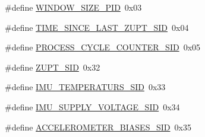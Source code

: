 \begin{DoxyCompactItemize}
\item 
\#define \hyperlink{group__tables_ga1e61a3b04f0d9e2a1393e85a047a24ab}{\-W\-I\-N\-D\-O\-W\-\_\-\-S\-I\-Z\-E\-\_\-\-P\-I\-D}~0x03
\item 
\#define \hyperlink{group__tables_gadc587c273985fd12fc0553141c5f9693}{\-T\-I\-M\-E\-\_\-\-S\-I\-N\-C\-E\-\_\-\-L\-A\-S\-T\-\_\-\-Z\-U\-P\-T\-\_\-\-S\-I\-D}~0x04
\item 
\#define \hyperlink{group__tables_gacc410e7c7f1185c5dd50ac503dccabbe}{\-P\-R\-O\-C\-E\-S\-S\-\_\-\-C\-Y\-C\-L\-E\-\_\-\-C\-O\-U\-N\-T\-E\-R\-\_\-\-S\-I\-D}~0x05
\item 
\#define \hyperlink{group__tables_ga1c2e91b10f17814f52bf09f647909d83}{\-Z\-U\-P\-T\-\_\-\-S\-I\-D}~0x32
\item 
\#define \hyperlink{group__tables_gad5186a188194306bbc87ddddc7644ddd}{\-I\-M\-U\-\_\-\-T\-E\-M\-P\-E\-R\-A\-T\-U\-R\-S\-\_\-\-S\-I\-D}~0x33
\item 
\#define \hyperlink{group__tables_gad0a37f572243f76ea1f2b79fc14b2a30}{\-I\-M\-U\-\_\-\-S\-U\-P\-P\-L\-Y\-\_\-\-V\-O\-L\-T\-A\-G\-E\-\_\-\-S\-I\-D}~0x34
\item 
\#define \hyperlink{group__tables_gaf0c693bf22229a5eba03b2bad37b07bf}{\-A\-C\-C\-E\-L\-E\-R\-O\-M\-E\-T\-E\-R\-\_\-\-B\-I\-A\-S\-E\-S\-\_\-\-S\-I\-D}~0x35
\end{DoxyCompactItemize}
